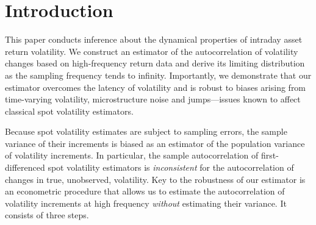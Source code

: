\documentclass[ecta,nameyear,draft]{econsocart}
\newcommand{\1}{\mathbf 1}
\numberwithin{equation}{section}
\begin{document}




\section{Introduction}


This paper conducts inference about the dynamical properties of intraday asset return volatility. We construct an estimator of the autocorrelation of volatility changes based on high-frequency return data and derive its limiting distribution as the sampling frequency tends to infinity. Importantly, we demonstrate that our estimator overcomes the latency of volatility and is robust to  biases arising from time-varying volatility, microstructure noise and   jumps---issues   known to affect classical spot volatility estimators. 


Because spot volatility estimates are subject to   sampling errors, the sample variance of their increments is biased as an estimator of the population variance of volatility increments. In particular,   the sample autocorrelation of first-differenced spot volatility estimators is   \emph{inconsistent}   for the autocorrelation of changes in  true, unobserved, volatility.  
Key to the robustness of our  estimator is an econometric procedure  that allows us to estimate the autocorrelation of volatility increments at high frequency \emph{without} estimating their variance. It consists of three steps.

\end{document}
